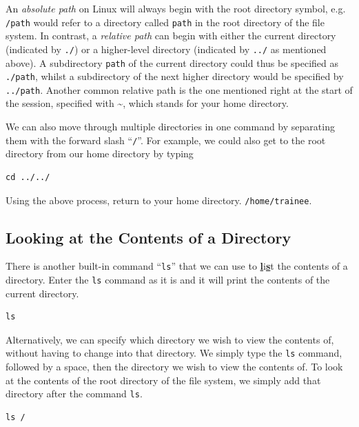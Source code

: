 \documentclass[a4paper,12pt,twoside]{memoir}
\begin{document}
\begin{information}
An \textit{absolute path} on Linux will always begin with the root directory symbol, e.g. \texttt{/path} would refer to a directory called \texttt{path} in the root directory of the file system.
In contrast, a \textit{relative path} can begin with either the current directory (indicated by \texttt{./}) or a higher-level directory (indicated by \texttt{../} as mentioned above).
A subdirectory \texttt{path} of the current directory could thus be specified as \texttt{./path}, whilst a subdirectory of the next higher directory would be specified by \texttt{../path}. 
Another common relative path is the one mentioned right at the start of the session, specified with \~{}, which stands for your home directory.\\
\end{information}

We can also move through multiple directories in one command by separating them with the forward slash ``\texttt{/}''.
For example, we could also get to the root directory from our home directory by typing \\
\begin{lstlisting}
cd ../../ 
\end{lstlisting}

\begin{steps}
Using the above process, return to your home directory.
\texttt{/home/trainee}. \\
\end{steps}

\subsection{Looking at the Contents of a Directory}
\begin{steps}
There is another built-in command ``\texttt{ls}'' that we can use to \textbf{\underline{l}}i\textbf{\underline{s}}t the contents of a directory.
Enter the \texttt{ls} command as it is and it will print the contents of the current directory. \\
\begin{lstlisting}
ls 
\end{lstlisting}
\end{steps}

\begin{steps}
Alternatively, we can specify which directory we wish to view the contents of, without having to change into that directory.
We simply type the \texttt{ls} command, followed by a space, then the directory we wish to view the contents of.
To look at the contents of the root directory of the file system, we simply add that directory after the command \texttt{ls}. \\
\begin{lstlisting}
ls /
\end{lstlisting}
\end{steps}
\end{document}

